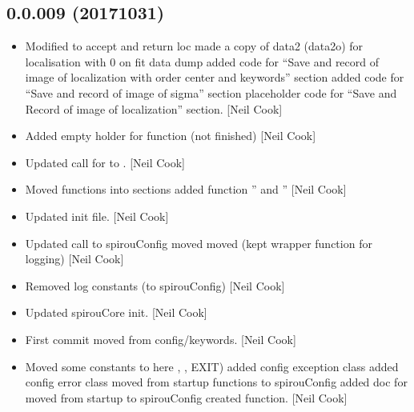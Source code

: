 \documentclass[a4paper,10pt,english]{report}
\begin{document}
\subsection{0.0.009 (2017\sphinxhyphen{}10\sphinxhyphen{}31)}
\label{\detokenize{misc/changelog:id561}}\begin{itemize}
\item {} 
Modified  to accept and
return loc made a copy of data2  (data2o) for localisation with 0 on
fit data dump added code for “Save and record of image of localization
with order center and keywords” section added code for “Save and
record of image of sigma” section placeholder code for “Save and
Record of image of localization” section. {[}Neil Cook{]}

\item {} 
Added empty holder for  function (not
finished) {[}Neil Cook{]}

\item {} 
Updated call for  to . {[}Neil Cook{]}

\item {} 
Moved functions into sections added function ” and
” {[}Neil Cook{]}

\item {} 
Updated init file. {[}Neil Cook{]}

\item {} 
Updated call to spirouConfig moved  moved
 (kept wrapper function for logging) {[}Neil Cook{]}

\item {} 
Removed log constants (to spirouConfig) {[}Neil Cook{]}

\item {} 
Updated spirouCore init. {[}Neil Cook{]}

\item {} 
First commit moved from config/keywords. {[}Neil Cook{]}

\item {} 
Moved some constants to here , , EXIT) added
config exception class added config error class moved
 from startup functions to spirouConfig added doc
for  moved  from startup to spirouConfig
created  function. {[}Neil Cook{]}


\end{itemize}
\end{document}
